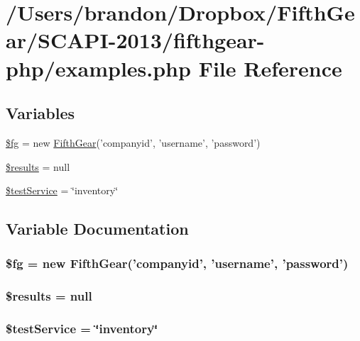 \hypertarget{examples_8php}{\section{/\-Users/brandon/\-Dropbox/\-Fifth\-Gear/\-S\-C\-A\-P\-I-\/2013/fifthgear-\/php/examples.php File Reference}
\label{examples_8php}
}
\subsection*{Variables}
\begin{DoxyCompactItemize}
\item 
\hyperlink{examples_8php_a9aabe663cd2b0b70b964c291b93dba64}{\$fg} = new \hyperlink{class_fifth_gear}{Fifth\-Gear}('companyid', 'username', 'password')
\item 
\hyperlink{examples_8php_a233d12bd8b6d3453e9a7a3f0b8c31db2}{\$results} = null
\item 
\hyperlink{examples_8php_ac63431a912ae1068a9b792c1ea2b1dda}{\$test\-Service} = \char`\"{}inventory\char`\"{}
\end{DoxyCompactItemize}


\subsection{Variable Documentation}
\hypertarget{examples_8php_a9aabe663cd2b0b70b964c291b93dba64}{
\subsubsection[{\$fg}]{\setlength{\rightskip}{0pt plus 5cm}\$fg = new {\bf Fifth\-Gear}('companyid', 'username', 'password')}}\label{examples_8php_a9aabe663cd2b0b70b964c291b93dba64}
\hypertarget{examples_8php_a233d12bd8b6d3453e9a7a3f0b8c31db2}{
\subsubsection[{\$results}]{\setlength{\rightskip}{0pt plus 5cm}\$results = null}}\label{examples_8php_a233d12bd8b6d3453e9a7a3f0b8c31db2}
\hypertarget{examples_8php_ac63431a912ae1068a9b792c1ea2b1dda}{
\subsubsection[{\$test\-Service}]{\setlength{\rightskip}{0pt plus 5cm}\$test\-Service = \char`\"{}inventory\char`\"{}}}\label{examples_8php_ac63431a912ae1068a9b792c1ea2b1dda}
